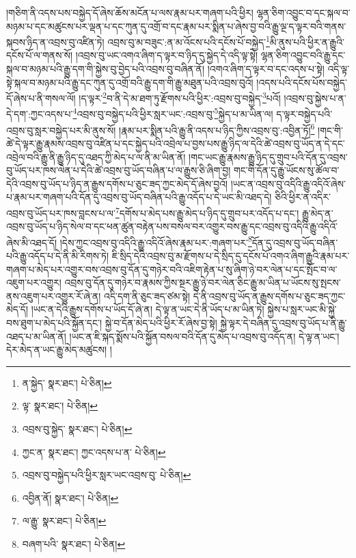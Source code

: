 །གཅིག་ནི་འདས་པས་བསྐྱེད་དོ་ཞེས་ཆོས་མངོན་པ་ལས་རྣམ་པར་གཞག་པའི་ཕྱིར། ལྷན་ཅིག་འབྱུང་བ་དང་སྐལ་བ་མཉམ་པ་དང་མཚུངས་པར་ལྡན་པ་དང་ཀུན་དུ་འགྲོ་བ་དང་རྣམ་པར་སྨིན་པ་ཞེས་བྱ་བའི་རྒྱུ་ལྔ་ད་ལྟར་བའི་གནས་སྐབས་ཉིད་ན་འབྲས་བུ་འཛིན་ཏེ། འབྲས་བུ་མ་བཟུང་:ན་མ་འོངས་པའི་དངོས་པོ་བསྐྱེད་\footnote{ན་སྐྱེད་  སྣར་ཐང་།  པེ་ཅིན། }མི་ནུས་པའི་ཕྱིར་ན་རྒྱུའི་དངོས་པོ་ལ་གནས་སོ། །འབྲས་བུ་ཡང་འགའ་ཞིག་ད་ལྟར་བ་ཉིད་དུ་སྐྱེད་དེ་འདི་ལྟ་སྟེ། ལྷན་ཅིག་འབྱུང་བའི་རྒྱུ་དང་སྐལ་བ་མཉམ་པའི་རྒྱུ་དག་གི་སྐྱེས་བུ་བྱེད་པའི་འབྲས་བུ་བཞིན་ནོ། །འགའ་ཞིག་ད་ལྟར་བ་དང་འདས་པ་སྟེ། འདི་ལྟ་སྟེ་སྐལ་བ་མཉམ་པའི་རྒྱུ་དང་ཀུན་དུ་འགྲོ་བའི་རྒྱུ་དག་གི་རྒྱུ་མཐུན་པའི་འབྲས་བུའོ། །འདས་པའི་དངོས་པོས་བསྐྱེད་དོ་ཞེས་པ་ནི་གསལ་ལོ། །ད་ལྟར་\footnote{ལྟ་  སྣར་ཐང་།  པེ་ཅིན། }བ་ནི་དེ་མ་ཐག་ཏུ་རྫོགས་པའི་ཕྱིར་:འབྲས་བུ་བསྐྱེད་\footnote{འབྲས་བུ་སྐྱེད་  སྣར་ཐང་།  པེ་ཅིན། }པའོ། །འབྲས་བུ་སྐྱེས་པ་ན་དེ་དག་:ཀྱང་འདས་པ་\footnote{ཀྱང་ན་  སྣར་ཐང་། ཀྱང་འདས་པ་ན་  པེ་ཅིན། }འབྲས་བུ་བསྐྱེད་པའི་ཕྱིར་སླར་ཡང་:འབྲས་བུ་\footnote{འབྲས་བུ་བསྐྱེད་པའི་ཕྱིར་སླར་ཡང་འབྲས་བུ་  པེ་ཅིན། }སྐྱེད་པ་མ་ཡིན་ལ། ད་ལྟར་བསྐྱེད་པའི་འབྲས་བུ་སླར་བསྐྱེད་པར་མི་ནུས་སོ། །རྣམ་པར་སྨིན་པའི་རྒྱུ་ནི་འདས་པ་ཉིད་ཀྱིས་འབྲས་བུ་:འབྱིན་ཏོ།\footnote{འབྱིན་ནོ།  སྣར་ཐང་།  པེ་ཅིན། } །གང་གི་ཚེ་དེ་ལྟར་རྒྱུ་རྣམས་འབྲས་བུ་འཛིན་པ་དང་སྐྱེད་པའི་འབྲེལ་པ་བྱས་པས་རྒྱུ་ཉིད་ལ་དེའི་ཚེ་འབྲས་བུ་ཡོད་ན་དེ་དང་འབྲེལ་བའི་རྒྱུ་ནི་རྒྱུ་ཉིད་དུ་འཐད་ཀྱི་མེད་པ་ལ་ནི་མ་ཡིན་ནོ། །གང་ཡང་རྒྱུ་རྣམས་རྒྱུ་ཉིད་དུ་གྲུབ་པའི་དོན་དུ་འབྲས་བུ་ཡོད་པར་ཁས་ལེན་པ་དེའི་ཚེ་འབྲས་བུ་ཡོད་བཞིན་པ་ལ་རྒྱུས་ཅི་ཞིག་བྱ། གང་གི་དོན་དུ་རྒྱུ་ཡོངས་སུ་ཚོལ་བ་དེའི་འབྲས་བུ་ཡོད་པ་ཉིད་ན་རྒྱུས་དགོས་པ་ཅུང་ཟད་ཀྱང་མེད་དོ་ཞེས་བྱའོ། །ཡང་ན་འབྲས་བུ་འདིའི་རྒྱུ་འདིའོ་ཞེས་པ་རྣམ་པར་གཞག་པའི་དོན་དུ་འབྲས་བུ་ཡོད་བཞིན་པའི་རྒྱུ་འདོད་པ་དེ་ཡང་མི་འཐད་དེ། ཅིའི་ཕྱིར་ན་འདིར་འབྲས་བུ་ཡོད་པར་ཁས་བླངས་པ་ལ་\footnote{ལ་རྒྱུ་  སྣར་ཐང་།  པེ་ཅིན། }དགོས་པ་མེད་པས་རྒྱུ་མེད་པ་ཉིད་དུ་གྲུབ་པར་འདོད་པ་དང་། རྒྱུ་མེད་ན་འབྲས་བུ་ཡོད་པ་ཉིད་སེལ་བ་དང་ཕན་ཚུན་བརྟེན་པས་བསལ་བར་འགྱུར་བས་རྒྱུ་དང་འབྲས་བུ་འདིའི་རྒྱུ་འདིའོ་ཞེས་མི་འཐད་དོ། །དེས་ཀྱང་འབྲས་བུ་འདིའི་རྒྱུ་འདིའོ་ཞེས་རྣམ་པར་:གཞག་པར་\footnote{བཞག་པའི་  སྣར་ཐང་།  པེ་ཅིན། }དོན་དུ་འབྲས་བུ་ཡོད་བཞིན་པའི་རྒྱུ་འདོད་པ་དེ་ནི་མི་རིགས་ཏེ། ཇི་སྲིད་དེའི་འབྲས་བུ་མ་རྫོགས་པ་དེ་སྲིད་དུ་དངོས་པོ་འགའ་ཞིག་རྒྱུའི་རྣམ་པར་གཞག་པ་མེད་པར་འགྱུར་བས་འབྲས་བུ་དོན་དུ་གཉེར་བའི་འཇིག་རྟེན་པ་སུ་ཞིག་ཉེ་བར་ལེན་པ་དང་སྤོང་བ་ལ་འཇུག་པར་འགྱུར། འབྲས་བུ་དོན་དུ་གཉེར་བ་རྣམས་ཀྱིས་སྔར་རྒྱུ་ཉེ་བར་ལེན་ཅིང་རྒྱུ་མ་ཡིན་པ་ཡོངས་སུ་སྤངས་ནས་འཇུག་པར་འགྱུར་རོ་ཞེ་ན། འདི་དག་ནི་ཅུང་ཟད་ཙམ་སྟེ། དེ་ནི་འབྲས་བུ་ཡོད་ན་རྒྱུས་དགོས་པ་ཅུང་ཟད་ཀྱང་མེད་དོ། །ཡང་ན་དེའི་རྒྱུས་དགོས་པ་ཡོད་དོ་ཞེ་ན། དེ་ལྟ་ན་ཡང་དེ་ནི་ཡོད་པ་མ་ཡིན་ཏེ། སྐྱེས་པ་སླར་ཡང་མི་སྐྱེ་བས་ཐུག་པ་མེད་པའི་སྐྱོན་དང་། སྐྱེ་བ་དོན་མེད་པའི་ཕྱིར་རོ་ཞེས་བྱ་སྟེ། སྐྱེ་ལྟར་དེ་བཞིན་དུ་འབྲས་བུ་ཡོད་པ་ནི་རྒྱུ་འཐད་པ་མ་ཡིན་ནོ། །ཡང་ན་ཇི་སྐད་སྨོས་པའི་སྐྱོན་བསལ་བའི་དོན་དུ་མེད་པ་འབྲས་བུ་འདོད་ན། དེ་ལྟ་ན་ཡང་། དེར་མེད་ན་ཡང་རྒྱུ་མེད་མཚུངས། །

